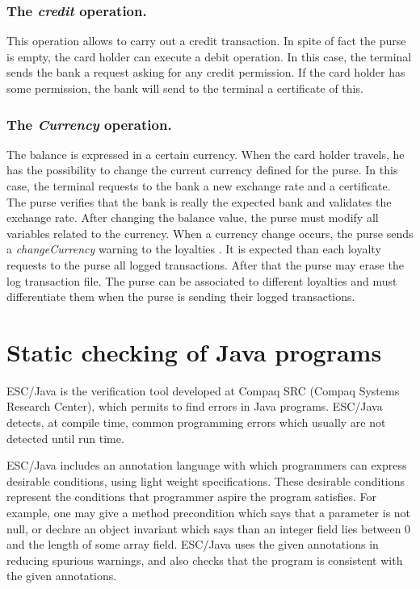 \documentclass[a4paper]{llncs}
\begin{document}
\subsubsection{\bf The \textit{credit} operation.} This operation allows
to carry out a credit transaction. In spite of fact the purse is
empty, the
card holder can execute a debit operation. In this case, the terminal
sends the bank a request asking for any credit permission. If the card 
holder has some permission, the bank will send to the terminal a
certificate of this.


\subsubsection{\bf The \textit{Currency} operation.} The balance is
expressed in a certain currency. When the card holder travels, he has
the possibility to
change the current currency defined for the purse. In this case, the
terminal requests to the bank a
new exchange rate and a certificate. The purse verifies that the bank is 
really the expected bank and validates the exchange rate. After
changing the balance value, the purse must modify all variables related
to the currency.
When a currency change occurs, the purse sends a
\textit{changeCurrency} warning to the loyalties . It is expected than
each loyalty
requests to the purse all logged transactions. After that the purse
may erase
the log transaction file. The purse can be associated to different
loyalties and must differentiate them when the purse is sending
their logged transactions. 






\section{Static checking of Java programs}
\label{SectStatic}


\label{SubSectEscJava}
ESC/Java is the verification tool developed at
Compaq SRC (Compaq Systems Research Center), which permits to find
 errors in Java programs. ESC/Java detects, at
compile time, common programming errors which usually are not
detected until run time. 

ESC/Java includes an annotation language with which
programmers can express desirable conditions, using light weight
specifications. These desirable conditions represent the conditions
that programmer aspire the program satisfies. For example, one may
give a method precondition which
says that a parameter is not null, or declare an object invariant which
says than an integer field lies between $0$ and the length of some
array field. ESC/Java uses the given annotations in reducing
spurious warnings, and also checks that the program is consistent with 
the given annotations. 
\end{document}
